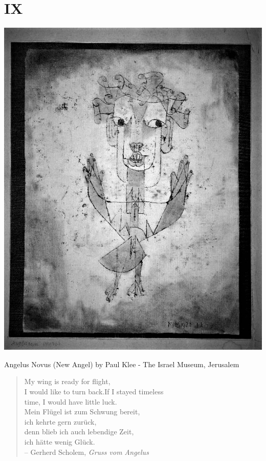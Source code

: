 \documentclass[12pt]{tufte-handout}
\begin{document}
\section{IX}
\begin{marginfigure}%
  \includegraphics[width=\linewidth]{graphics/Klee,_paul,_angelus_novus,_1920.jpg}
  \caption{Angelus Novus (New Angel) by Paul Klee - The Israel Museum, Jerusalem}
  \label{fig:AngelusNovus}
\end{marginfigure}
\begin{quote}
My wing is ready for flight, \\ 
I would like to turn back.If I stayed timeless \\time, 
I would have little luck. \\
 
 
Mein Flügel ist zum Schwung bereit,\\
ich kehrte gern zurück,\\
denn blieb ich auch lebendige Zeit,\\
ich hätte wenig Glück.\\

-- Gerherd Scholem, \textit{Gruss vom Angelus}
\end{quote} 	
 
\end{document}
